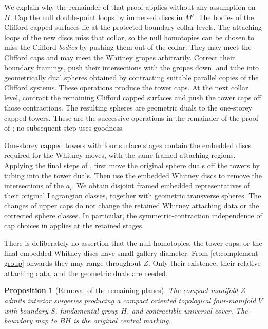 \documentclass[11pt]{article}
\newtheorem{proposition}[theorem]{Proposition}
\theoremstyle{definition}
\theoremstyle{remark}
\begin{document}
We explain why the remainder of that proof applies without any
assumption on $H$.  Cap the null double-point loops by immersed
discs in $M'$.  The bodies of the Clifford capped surfaces lie at
the protected boundary-collar levels.  The attaching loops of the
new discs miss that collar, so the null homotopies can be chosen
to miss the Clifford \emph{bodies} by pushing them out of the
collar.  They may meet the Clifford caps and may meet the Whitney
gropes arbitrarily.  Correct their boundary framings, push their
intersections with the gropes down, and tube into geometrically
dual spheres obtained by contracting suitable parallel copies of
the Clifford systems.  These operations produce the tower caps.
At the next collar level, contract the remaining Clifford capped
surfaces and push the tower caps off those contractions.  The
resulting spheres are geometric duals to the one-storey capped
towers.  These are the successive operations in the remainder of
the proof of \cite[Lemma~4.2]{PRT}; no subsequent step uses goodness.

One-storey capped towers with four surface stages contain the
embedded discs required for the Whitney moves, with the same
framed attaching regions.  Applying the final steps of
\cite[Section~5]{PRT}, first move the original sphere duals off the
towers by tubing into the tower duals.  Then use the embedded
Whitney discs to remove the intersections of the $a_i$.  We obtain
disjoint framed embedded representatives of their original
Lagrangian classes, together with geometric transverse spheres.
The changes of upper caps do not change the retained Whitney
attaching data or the corrected sphere classes.  In particular,
the symmetric-contraction independence of cap choices in
\cite[Lemma~3.4]{PRT} applies at the retained stages.

There is deliberately no assertion that the null homotopies, the
tower caps, or the final embedded Whitney discs have small gallery
diameter.  From \eqref{ct:complement-group} onwards they may range
throughout $Z$.  Only their existence, their relative attaching
data, and the geometric duals are needed.

\begin{proposition}[Removal of the remaining planes]\label{ct:removal}
The compact manifold $Z$ admits interior surgeries producing a
compact oriented topological four-manifold $V$ with boundary $S$,
fundamental group $H$, and contractible universal cover.  The
boundary map to $BH$ is the original central marking.
\end{proposition}
\end{document}
